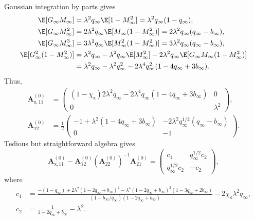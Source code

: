 \documentclass[]{article}
\def\sx{{\mathsf x}}
\def\bA{{\boldsymbol A}}
\def\bA{{\boldsymbol A}}
\begin{document}
Gaussian integration by parts gives
\begin{equation}
\begin{aligned}
    \E[G_\infty M_\infty] &= \lambda^2 q_\infty \E[1- M_\infty^2] = \lambda^2 q_\infty (1-q_\infty),
    \\
    \E[G_\infty M_\infty^2] &= 2\lambda^2 q_\infty \E[M_\infty(1-M_\infty^2)] = 2\lambda^2 q_\infty (q_\infty - b_\infty),
    \\
    \E[G_\infty M_\infty^3] &= 3\lambda^2 q_\infty  \E[M_\infty^2(1-M_\infty^2)] = 3\lambda^2 q_\infty(q_\infty - b_\infty),
    \\
    \E[G_\infty^2(1-M_\infty^2)] &= \lambda^2 q_\infty  - \lambda^2 q_\infty  \E[M_\infty^2] - 2\lambda^2 q_\infty \E[G_\infty M_\infty(1-M_\infty^2)]
    \\
        &= 
        \lambda^2 q_\infty - \lambda^2 q_\infty^2 - 2 \lambda^4 q_\infty^2(1-4q_\infty + 3b_\infty).
\end{aligned}
\end{equation}
Thus, 
\begin{equation}
\begin{aligned}
    \bA^{(0)}_{\sx,11} 
        &=
        \begin{pmatrix}
            (1-\chi_{\sx})2\lambda^2 q_\infty
            - 2 \lambda^4 q_\infty(1 - 4q_\infty + 3b_\infty)
            & 0 \\[5pt]
            0 & \lambda^2 
        \end{pmatrix},
    \\
    \bA_{12}^{(0)}
        &= 
        \frac12
        \begin{pmatrix}
            -1 + \lambda^2(1 - 4q_\infty + 3 b_\infty)
            & -2\lambda^2q_\infty^{1/2}(q_\infty- b_\infty)
            \\[5pt]
            0 & - 1
        \end{pmatrix}.
\end{aligned}
\end{equation}
Tedious but straightforward algebra gives
\begin{equation}
    \bA_{\sx,11}^{(0)} - \bA_{12}^{(0)} (\bA_{22}^{(0)})^{-1} \bA_{21}^{(0)}
        =
        \begin{pmatrix}
            c_1 & q_\infty^{1/2}c_2 \\[5pt]
            q_\infty^{1/2}c_2 & -c_2
        \end{pmatrix},
\end{equation}
where
\begin{equation}
\begin{aligned}
    c_1    
        &=
        \frac{-(1-q_\infty) + 2 \lambda^2(1-2q_\infty + b_\infty)^2 - \lambda^4(1-2q_\infty + b_\infty)^2(1-3q_\infty+2b_\infty)}{(1 - b_\infty/q_\infty)(1 - 2q_\infty + b_\infty)} - 2 \chi_{\sx} \lambda^2 q_\infty,
    \\
    c_2
        &=
        \frac{1}{1 - 2q_\infty + b_\infty}- \lambda^2.
\end{aligned}
\end{equation}
\end{document}
